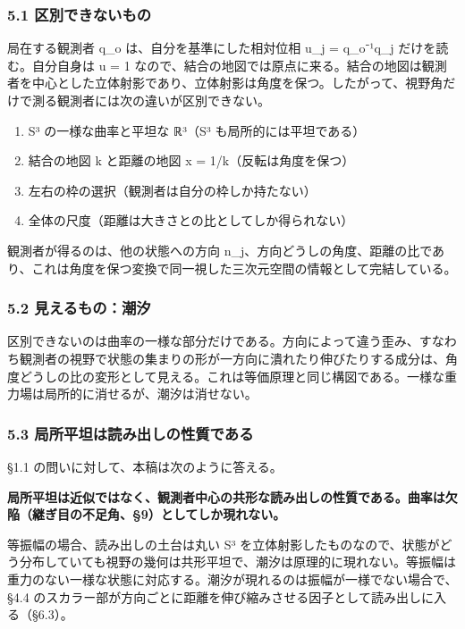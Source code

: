 \documentclass[
  a4paper,
]{ltjsarticle}
\providecommand{\tightlist}{%
  \setlength{\itemsep}{0pt}\setlength{\parskip}{0pt}}
\begin{document}
\subsubsection{5.1
区別できないもの}\label{ux533aux5225ux3067ux304dux306aux3044ux3082ux306e}

局在する観測者 q\_o は、自分を基準にした相対位相 u\_j = q\_o⁻¹q\_j
だけを読む。自分自身は u = 1
なので、結合の地図では原点に来る。結合の地図は観測者を中心とした立体射影であり、立体射影は角度を保つ。したがって、視野角だけで測る観測者には次の違いが区別できない。

\begin{enumerate}
\def\labelenumi{\arabic{enumi}.}
\tightlist
\item
  S³ の一様な曲率と平坦な ℝ³（S³ も局所的には平坦である）
\item
  結合の地図 k と距離の地図 x = 1/k（反転は角度を保つ）
\item
  左右の枠の選択（観測者は自分の枠しか持たない）
\item
  全体の尺度（距離は大きさとの比としてしか得られない）
\end{enumerate}

観測者が得るのは、他の状態への方向
n\_j、方向どうしの角度、距離の比であり、これは角度を保つ変換で同一視した三次元空間の情報として完結している。

\subsubsection{5.2
見えるもの：潮汐}\label{ux898bux3048ux308bux3082ux306eux6f6eux6c50}

区別できないのは曲率の一様な部分だけである。方向によって違う歪み、すなわち観測者の視野で状態の集まりの形が一方向に潰れたり伸びたりする成分は、角度どうしの比の変形として見える。これは等価原理と同じ構図である。一様な重力場は局所的に消せるが、潮汐は消せない。

\subsubsection{5.3
局所平坦は読み出しの性質である}\label{ux5c40ux6240ux5e73ux5766ux306fux8aadux307fux51faux3057ux306eux6027ux8ceaux3067ux3042ux308b}

§1.1 の問いに対して、本稿は次のように答える。

\textbf{局所平坦は近似ではなく、観測者中心の共形な読み出しの性質である。曲率は欠陥（継ぎ目の不足角、§9）としてしか現れない。}

等振幅の場合、読み出しの土台は丸い S³
を立体射影したものなので、状態がどう分布していても視野の幾何は共形平坦で、潮汐は原理的に現れない。等振幅は重力のない一様な状態に対応する。潮汐が現れるのは振幅が一様でない場合で、§4.4
のスカラー部が方向ごとに距離を伸び縮みさせる因子として読み出しに入る（§6.3）。
\end{document}
